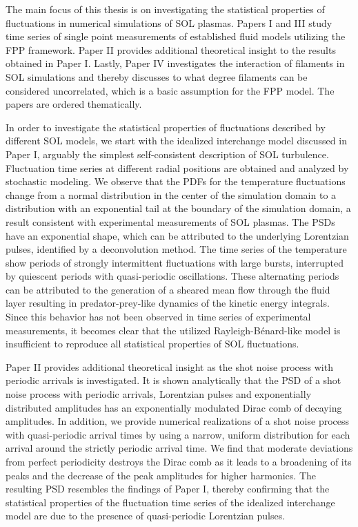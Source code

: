 The main focus of this thesis is on investigating the statistical properties of fluctuations in numerical simulations of SOL plasmas.  Papers I and III study time series of single point measurements of established fluid models utilizing the FPP framework. Paper II provides additional theoretical insight to the results obtained in Paper I. Lastly, Paper IV investigates the interaction of filaments in SOL simulations and thereby discusses to what degree filaments can be considered uncorrelated, which is a basic assumption for the FPP model. The papers are ordered thematically.

In order to investigate the statistical properties of fluctuations described by different SOL models, we start with the idealized interchange model discussed in Paper I, arguably the simplest self-consistent description of SOL turbulence. Fluctuation time series at different radial positions are obtained and analyzed by stochastic modeling. We observe that the PDFs for the temperature fluctuations change from a normal distribution in the center of the simulation domain to a distribution with an exponential tail at the boundary of the simulation domain, a result consistent with experimental measurements of SOL plasmas. The PSDs have an exponential shape, which can be attributed to the underlying Lorentzian pulses, identified by a deconvolution method. The time series of the temperature show periods of strongly intermittent fluctuations with large bursts, interrupted by quiescent periods with quasi-periodic oscillations. These alternating periods can be attributed to the generation of a sheared mean flow through the fluid layer resulting in predator-prey-like dynamics of the kinetic energy integrals. Since this behavior has not been observed in time series of experimental measurements, it becomes clear that the utilized Rayleigh-Bénard-like model is insufficient to reproduce all statistical properties of SOL fluctuations.

Paper II provides additional theoretical insight as the shot noise process with periodic arrivals is investigated. It is shown analytically that the PSD of a shot noise process with periodic arrivals, Lorentzian pulses and exponentially distributed amplitudes has an exponentially modulated Dirac comb of decaying amplitudes. In addition, we provide numerical realizations of a shot noise process with quasi-periodic arrival times by using a narrow, uniform distribution for each arrival around the strictly periodic arrival time. We find that moderate deviations from perfect periodicity destroys the Dirac comb as it leads to a broadening of its peaks and the decrease of the peak amplitudes for higher harmonics. The resulting PSD resembles the findings of Paper I, thereby confirming that the statistical properties of the fluctuation time series of the idealized interchange model are due to the presence of quasi-periodic Lorentzian pulses.

